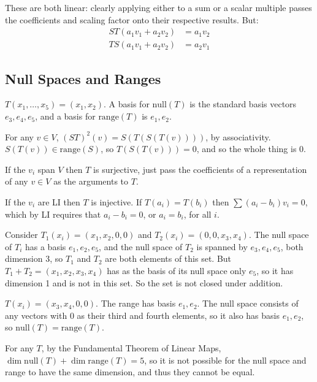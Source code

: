 \documentclass{article}
\begin{document}
These are both linear: clearly applying either to a sum or a scalar multiple
passes the coefficients and scaling factor onto their respective results. But:
\begin{align*}
  ST(a_1v_1 + a_2v_2) & = a_1v_2 \\
  TS(a_1v_1 + a_2v_2) & = a_2v_1
\end{align*}

\subsection{Null Spaces and Ranges}


$T(x_1, \ldots, x_5) = (x_1, x_2)$. A basis for $\text{null}(T)$ is the
standard basis vectors $e_3, e_4, e_5$, and a basis for $\text{range}(T)$ is
$e_1, e_2$.


For any $v \in V$, $(ST)^2(v) = S(T(S(T(v))))$, by associativity. $S(T(v)) \in
\text{range}(S)$, so $T(S(T(v))) = 0$, and so the whole thing is 0.


If the $v_i$ span $V$ then $T$ is surjective, just pass the coefficients of a
representation of any $v \in V$ as the arguments to $T$.


If the $v_i$ are LI then $T$ is injective. If $T(a_i) = T(b_i)$ then $\sum (a_i
- b_i)v_i = 0$, which by LI requires that $a_i - b_i = 0$, or $a_i = b_i$, for
all $i$.


Consider $T_1(x_i) = (x_1, x_2, 0, 0)$ and $T_2(x_i) = (0, 0, x_3, x_4)$. The
null space of $T_i$ has a basis $e_1, e_2, e_5$, and the null space of $T_2$
is spanned by $e_3, e_4, e_5$, both dimension 3, so $T_1$ and $T_2$ are both
elements of this set. But $T_1 + T_2 = (x_1, x_2, x_3, x_4)$ has as the basis of
its null space only $e_5$, so it has dimension 1 and is not in this set. So the
set is not closed under addition.


$T(x_i) = (x_3, x_4, 0, 0)$. The range has basis $e_1, e_2$. The null space
consists of any vectors with 0 as their third and fourth elements, so it also
has basis $e_1, e_2$, so $\text{null}(T) = \text{range}(T)$.


For any $T$, by the Fundamental Theorem of Linear Maps, $\dim \text{null}(T) +
\dim \text{range}(T) = 5$, so it is not possible for the null space and range to
have the same dimension, and thus they cannot be equal.
\end{document}
